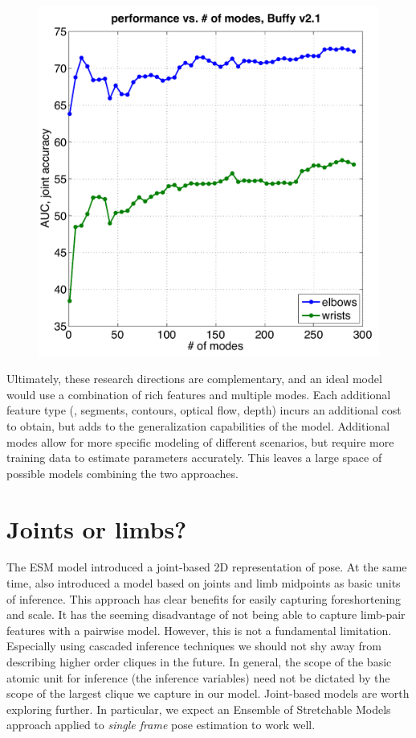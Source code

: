 \begin{figure}[htb!]
\centering
\includegraphics[width=0.59\linewidth]{figs/llps-learning-curve.pdf}
\caption[Test accuracy versus number of local neighborhood modes in LLPS.]{
\label{fig:llps-learning-curve} }
\end{figure}


Ultimately, these research directions are complementary, and an ideal model 
would use a combination of rich features and multiple modes. Each additional 
feature type (\eg, segments, contours, optical flow, depth) incurs an 
additional cost to obtain, but adds to the generalization capabilities of the 
model. Additional modes allow for more specific modeling of different 
scenarios, but require more training data to estimate parameters accurately.  
This leaves a large space of possible models combining the two approaches.

\section{Joints or limbs?}

The ESM model introduced a joint-based 2D representation of pose.  At the same 
time, \citet{deva2011} also introduced a model based on joints and limb 
midpoints as basic units of inference.  This approach has clear benefits for 
easily capturing foreshortening and scale.  It has the seeming disadvantage of 
not being able to capture limb-pair features with a pairwise model.  However, 
this is not a fundamental limitation.  Especially using cascaded inference 
techniques we should not shy away from describing higher order cliques in the 
future.  In general, the scope of the basic atomic unit for inference (the 
inference variables) need not be dictated by the scope of the largest clique we 
capture in our model.  Joint-based models are worth exploring further.  In 
particular, we expect an Ensemble of Stretchable Models approach applied to 
{\em single frame} pose estimation to work well.

